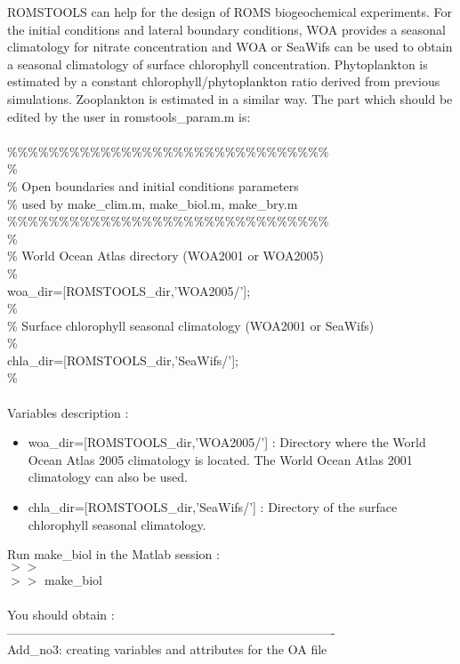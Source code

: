 ROMSTOOLS can help for the design of ROMS biogeochemical 
experiments. For the initial conditions and lateral boundary
conditions, WOA provides a seasonal climatology for nitrate
concentration and WOA or SeaWifs can be used to obtain a 
seasonal climatology of surface chlorophyll concentration.
Phytoplankton is estimated by a constant chlorophyll/phytoplankton 
ratio derived from previous simulations. Zooplankton is estimated
in a similar way. The part which should be edited by the user in 
romstools\_param.m is:\\
\\ 
\%\%\%\%\%\%\%\%\%\%\%\%\%\%\%\%\%\%\%\%\%\%\%\%\%\%\%\%\%\%\%\\
\%\\
\% Open boundaries and initial conditions parameters\\
\%   used by make\_clim.m, make\_biol.m, make\_bry.m\\
\%\%\%\%\%\%\%\%\%\%\%\%\%\%\%\%\%\%\%\%\%\%\%\%\%\%\%\%\%\%\%\\
\%\\
\% World Ocean Atlas directory (WOA2001 or WOA2005) \\
\%\\
woa\_dir=[ROMSTOOLS\_dir,'WOA2005/'];\\
\%\\
\% Surface chlorophyll seasonal climatology (WOA2001 or SeaWifs)\\
\%\\
chla\_dir=[ROMSTOOLS\_dir,'SeaWifs/'];\\
\%\\\\
Variables description :
\begin{itemize}
\item woa\_dir=[ROMSTOOLS\_dir,'WOA2005/'] : Directory where the World Ocean
Atlas 2005 climatology \citep{Con02} is located. The World Ocean
Atlas 2001 climatology can also be used.
\item chla\_dir=[ROMSTOOLS\_dir,'SeaWifs/'] : Directory of the surface 
chlorophyll seasonal climatology.
\end{itemize}
Run make\_biol in the Matlab session :\\
$>>$\\
$>>$ make\_biol\\\\
You should obtain :\\
-------------------------------------------------------------------------------\\
Add\_no3: creating variables and attributes for the OA file\\
